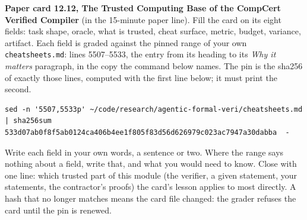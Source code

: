 \documentclass[11pt]{article}
\begin{document}
\begin{problem}\label{prob:B2}
\textbf{Paper card 12.12, The Trusted Computing Base of the CompCert Verified
Compiler} (in the 15-minute paper line). Fill the card on its eight fields:
task shape, oracle, what is trusted, cheat surface, metric, budget,
variance, artifact. Each field is graded against the pinned range of your
own \texttt{cheatsheets.md}: lines 5507--5533, the entry from its heading to
its \emph{Why it matters} paragraph, in the copy the command below names.
The pin is the sha256 of exactly those lines, computed with the first line
below; it must print the second.
{\small
\begin{verbatim}
sed -n '5507,5533p' ~/code/research/agentic-formal-veri/cheatsheets.md | sha256sum
533d07ab0f8f5ab0124ca406b4ee1f805f83d56d626979c023ac7947a30dabba  -
\end{verbatim}
}
Write each field in your own words, a sentence or two. Where the range says
nothing about a field, write that, and what you would need to know. Close
with one line: which trusted part of this module (the verifier, a given
statement, your statements, the contractor's proofs) the card's lesson
applies to most directly. A hash that no longer matches means the card file
changed: the grader refuses the card until the pin is renewed.
\end{problem}
\end{document}
